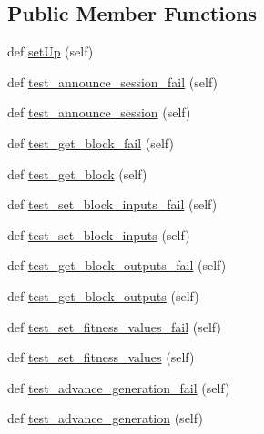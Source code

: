 \subsection*{Public Member Functions}
\begin{DoxyCompactItemize}
\item 
def \hyperlink{classtest__simulationClient_1_1TestSimulationClient_a2158e81999b611b537f501ccdde2a48b}{set\+Up} (self)
\item 
def \hyperlink{classtest__simulationClient_1_1TestSimulationClient_a66878970940d91d25aa31d26d82423f5}{test\+\_\+announce\+\_\+session\+\_\+fail} (self)
\item 
def \hyperlink{classtest__simulationClient_1_1TestSimulationClient_ab8dad4e84f26962411e10220432df20e}{test\+\_\+announce\+\_\+session} (self)
\item 
def \hyperlink{classtest__simulationClient_1_1TestSimulationClient_a85c766dcc9ff92c84be1e8ebf36b5720}{test\+\_\+get\+\_\+block\+\_\+fail} (self)
\item 
def \hyperlink{classtest__simulationClient_1_1TestSimulationClient_aee24796edf2705f0d2ceeae1ae3cb6a0}{test\+\_\+get\+\_\+block} (self)
\item 
def \hyperlink{classtest__simulationClient_1_1TestSimulationClient_aafa3de09dec65faac6c8f52722146c56}{test\+\_\+set\+\_\+block\+\_\+inputs\+\_\+fail} (self)
\item 
def \hyperlink{classtest__simulationClient_1_1TestSimulationClient_ac08741ece38b81f2a2c6e63df0b9a964}{test\+\_\+set\+\_\+block\+\_\+inputs} (self)
\item 
def \hyperlink{classtest__simulationClient_1_1TestSimulationClient_ae3aee15dd6eff9f84502ac6bead6102f}{test\+\_\+get\+\_\+block\+\_\+outputs\+\_\+fail} (self)
\item 
def \hyperlink{classtest__simulationClient_1_1TestSimulationClient_a0306cdc2466110be3a2315cfe4da2ffc}{test\+\_\+get\+\_\+block\+\_\+outputs} (self)
\item 
def \hyperlink{classtest__simulationClient_1_1TestSimulationClient_a2c64252c900866e02869171d4d4e142f}{test\+\_\+set\+\_\+fitness\+\_\+values\+\_\+fail} (self)
\item 
def \hyperlink{classtest__simulationClient_1_1TestSimulationClient_aed85ad39f28589c686ffaef4a172b28d}{test\+\_\+set\+\_\+fitness\+\_\+values} (self)
\item 
def \hyperlink{classtest__simulationClient_1_1TestSimulationClient_ac3c3dae5a25490a5134a02e5cf210f03}{test\+\_\+advance\+\_\+generation\+\_\+fail} (self)
\item 
def \hyperlink{classtest__simulationClient_1_1TestSimulationClient_a7ea27509c8c5cec4032425a5a2556c59}{test\+\_\+advance\+\_\+generation} (self)
\end{DoxyCompactItemize}
